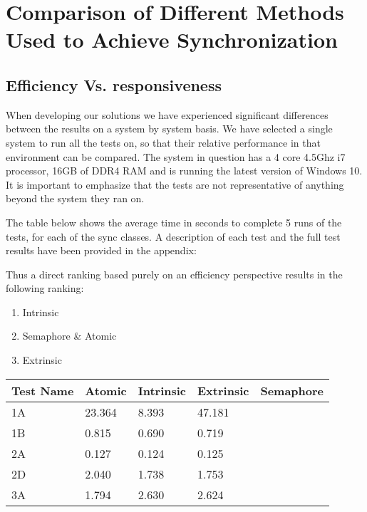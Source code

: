 \documentclass[11pt]{article}
\begin{document}
\maketitle
\tableofcontents
\thispagestyle{empty}
\pagebreak
\setcounter{page}{1}

\section{Comparison of Different Methods Used to Achieve Synchronization}

\subsection{Efficiency Vs. responsiveness}

When developing our solutions we have experienced significant differences between the results on a system by system basis. We have selected a single system to run all the tests on, so that their relative performance in that environment can be compared. The system in question has a 4 core 4.5Ghz i7 processor, 16GB of DDR4 RAM and is running the latest version of Windows 10. It is important to emphasize that the tests are not representative of anything beyond the system they ran on.

The table below shows the average time in seconds to complete 5 runs of the tests, for each of the sync classes. A description of each test and the full test results have been provided in the appendix: 

Thus a direct ranking based purely on an efficiency perspective results in the following ranking: 

\begin{enumerate}
	\item Intrinsic
	\item Semaphore \& Atomic
	\item Extrinsic
\end{enumerate}


\begin{table}[H]
\begin{tabular}{|l|l|l|l|l|}
\hline
Test Name & Atomic & Intrinsic & Extrinsic & Semaphore \\ \hline
1A        & 23.364 & 8.393     & 47.181    &           \\ \hline
1B        & 0.815  & 0.690     & 0.719     &           \\ \hline
2A        & 0.127  & 0.124     & 0.125     &           \\ \hline
2D        & 2.040  & 1.738     & 1.753     &           \\ \hline
3A        & 1.794  & 2.630     & 2.624     &           \\ \hline
\end{tabular}
\end{table}
\end{document}
